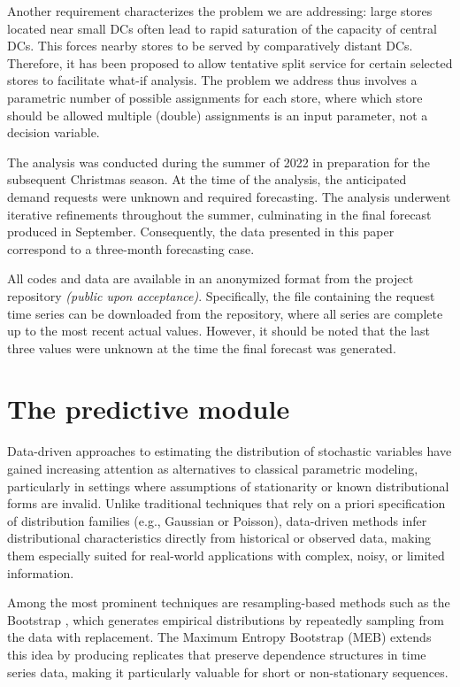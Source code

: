 \documentclass[11pt]{article}
\begin{document}
Another requirement characterizes the problem we are addressing: large stores located near small DCs often lead to rapid saturation of the capacity of central DCs. This forces nearby stores to be served by comparatively distant DCs. Therefore, it has been proposed to allow tentative split service for certain selected stores to facilitate what-if analysis. The problem we address thus involves a parametric number of possible assignments for each store, where which store should be allowed multiple (double) assignments is an input parameter, not a decision variable.  

The analysis was conducted during the summer of 2022 in preparation for the subsequent Christmas season. At the time of the analysis, the anticipated demand requests were unknown and required forecasting. The analysis underwent iterative refinements throughout the summer, culminating in the final forecast produced in September. Consequently, the data presented in this paper correspond to a three-month forecasting case. 

All codes and data are available in an anonymized format from the project repository 
{\it (public upon acceptance)}. Specifically, the file containing the request time series can be downloaded from the repository, where all series are complete up to the most recent actual values. However, it should be noted that the last three values were unknown at the time the final forecast was generated. 

\section{The predictive module} \label{Sec:forecasting}

Data-driven approaches to estimating the distribution of stochastic variables have gained increasing attention as alternatives to classical parametric modeling, particularly in settings where assumptions of stationarity or known distributional forms are invalid. Unlike traditional techniques that rely on a priori specification of distribution families (e.g., Gaussian or Poisson), data-driven methods infer distributional characteristics directly from historical or observed data, making them especially suited for real-world applications with complex, noisy, or limited information.

Among the most prominent techniques are resampling-based methods such as the Bootstrap \citep{b1}, which generates empirical distributions by repeatedly sampling from the data with replacement. The Maximum Entropy Bootstrap (MEB) \citep{Vinod2006} extends this idea by producing replicates that preserve dependence structures in time series data, making it particularly valuable for short or non-stationary sequences.
\end{document}
